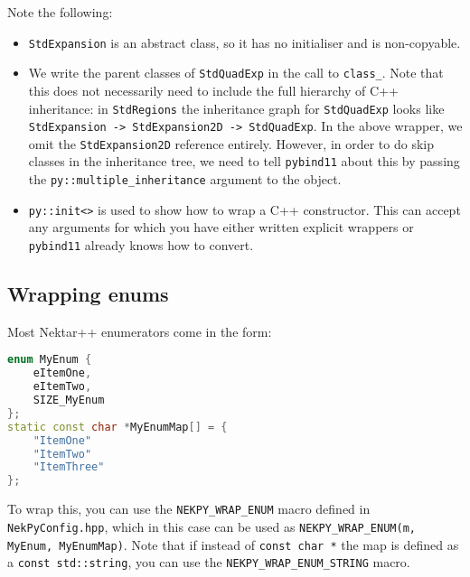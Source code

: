 Note the following:

\begin{itemize}
  \item \texttt{StdExpansion} is an abstract class, so it has no initialiser and
  is non-copyable.
  \item We write the parent classes of \texttt{StdQuadExp} in the call to
  \texttt{class\_}. Note that this does not necessarily need to include the full
  hierarchy of C++ inheritance: in \texttt{StdRegions} the inheritance graph for
  \texttt{StdQuadExp} looks like \texttt{StdExpansion -> StdExpansion2D ->
    StdQuadExp}. In the above wrapper, we omit the \texttt{StdExpansion2D}
  reference entirely. However, in order to do skip classes in the inheritance
  tree, we need to tell \texttt{pybind11} about this by passing the
  \texttt{py::multiple\_inheritance} argument to the object.
  \item \texttt{py::init<>} is used to show how to wrap a C++ constructor. This
  can accept any arguments for which you have either written explicit wrappers
  or \texttt{pybind11} already knows how to convert.
\end{itemize}

\subsection{Wrapping enums}

Most Nektar++ enumerators come in the form:

\begin{lstlisting}[language=C++]
enum MyEnum {
    eItemOne,
    eItemTwo,
    SIZE_MyEnum
};
static const char *MyEnumMap[] = {
    "ItemOne"
    "ItemTwo"
    "ItemThree"
};
\end{lstlisting}

To wrap this, you can use the \texttt{NEKPY\_WRAP\_ENUM} macro defined in
\texttt{NekPyConfig.hpp}, which in this case can be used as
\texttt{NEKPY\_WRAP\_ENUM(m, MyEnum, MyEnumMap)}. Note that if instead of
\texttt{const char *} the map is defined as a \texttt{const std::string}, you
can use the \texttt{NEKPY\_WRAP\_ENUM\_STRING} macro.
